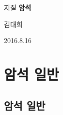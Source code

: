 \documentclass[12pt, a4paper, twoside]{book}
\begin{document}
	
			\noptcrule 	%
			\dominitoc 		
			\doparttoc
			\dopartlof
			\dopartlot
			



	
	
		\clearpage
		\begin{titlepage}
			\centering
			\null
			\vspace{2cm}
			{지질 \huge\bfseries 암석} \par
			\vspace{2cm}
			{\Large 김대희\par}
			\vfill
			{\large 2016.8.16 \par}
			\vspace{2cm}
		\end{titlepage}
		\newpage
		\thispagestyle{empty}



			\tableofcontents
			\listoffigures
			\listoftables





	
	
		\part{암석 일반}
	

	
	
	
	\clearpage
	\chapter{암석 일반}
	\minitoc				%
\end{document}
